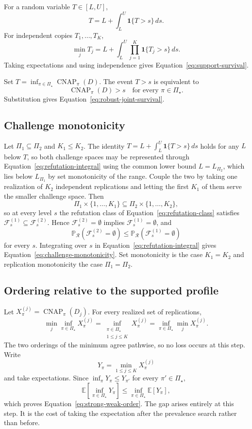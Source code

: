\documentclass[11pt]{article}
\newcommand{\CNAP}{\operatorname{CNAP}}
\newcommand{\Regime}{\mathcal{R}}
\newcommand{\PSet}{\Pi_\star}
\newcommand{\E}{\mathbb{E}}
\newcommand{\Prb}{\mathbb{P}}
\newcommand{\RefSet}{\mathcal{F}}
\theoremstyle{remark}
\begin{document}
For a random variable $T\in[L,U]$,
\[
T
=
L+\int_L^U\mathbf{1}\{T>s\}\,ds.
\]
For independent copies $T_1,\ldots,T_K$,
\[
\min_jT_j
=
L+
\int_L^U
\prod_{j=1}^{K}
\mathbf{1}\{T_j>s\}\,ds.
\]
Taking expectations and using independence gives Equation~\eqref{eq:support-survival}.

Set $T=\inf_{\pi\in\PSet}\CNAP_\pi(D)$. The event $T>s$ is equivalent to
\[
\CNAP_\pi(D)>s
\quad
\text{for every }\pi\in\PSet.
\]
Substitution gives Equation~\eqref{eq:robust-joint-survival}.

\subsection{Challenge monotonicity}

Let $\Pi_1\subseteq\Pi_2$ and $K_1\leq K_2$. The identity $T=L+\int_L^U\mathbf{1}\{T>s\}\,ds$ holds for any $L$ below $T$, so both challenge spaces may be represented through Equation~\eqref{eq:refutation-integral} using the common lower bound $L=L_{\Pi_2}$, which lies below $L_{\Pi_1}$ by set monotonicity of the range. Couple the two by taking one realization of $K_2$ independent replications and letting the first $K_1$ of them serve the smaller challenge space. Then
\[
\Pi_1\times\{1,\ldots,K_1\}
\subseteq
\Pi_2\times\{1,\ldots,K_2\},
\]
so at every level $s$ the refutation class of Equation~\eqref{eq:refutation-class} satisfies $\RefSet_s^{(1)}\subseteq\RefSet_s^{(2)}$. Hence $\RefSet_s^{(2)}=\emptyset$ implies $\RefSet_s^{(1)}=\emptyset$, and
\[
\Prb_{\Regime}\left(\RefSet_s^{(2)}=\emptyset\right)
\leq
\Prb_{\Regime}\left(\RefSet_s^{(1)}=\emptyset\right)
\]
for every $s$. Integrating over $s$ in Equation~\eqref{eq:refutation-integral} gives Equation~\eqref{eq:challenge-monotonicity}. Set monotonicity is the case $K_1=K_2$ and replication monotonicity the case $\Pi_1=\Pi_2$.

\subsection{Ordering relative to the supported profile}

Let $X_\pi^{(j)}=\CNAP_\pi(D_j)$. For every realized set of replications,
\[
\min_j\inf_{\pi\in\PSet}X_\pi^{(j)}
=
\inf_{\substack{\pi\in\PSet\\1\leq j\leq K}}
X_\pi^{(j)}
=
\inf_{\pi\in\PSet}\min_jX_\pi^{(j)}.
\]
The two orderings of the minimum agree pathwise, so no loss occurs at this step. Write
\[
Y_\pi=\min_{1\leq j\leq K}X_\pi^{(j)}
\]
and take expectations. Since $\inf_\pi Y_\pi\leq Y_{\pi'}$ for every $\pi'\in\PSet$,
\[
\E\left[\inf_{\pi\in\PSet}Y_\pi\right]
\leq
\inf_{\pi\in\PSet}\E[Y_\pi],
\]
which proves Equation~\eqref{eq:strong-weak-order}. The gap arises entirely at this step. It is the cost of taking the expectation after the prevalence search rather than before.
\end{document}
